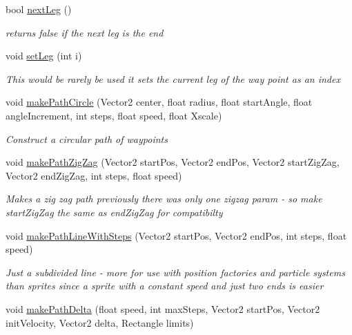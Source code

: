 \begin{DoxyCompactItemize}
bool \mbox{\hyperlink{class_r_c___framework_1_1_way_point_list_aa1d992bceb400ee9fcf657e6a4c379f8}{next\+Leg}} ()
\begin{DoxyCompactList}\small\item\em returns false if the next leg is the end ~\newline
\end{DoxyCompactList}\item 
void \mbox{\hyperlink{class_r_c___framework_1_1_way_point_list_ada4f7ff83ceacd5494f4ed71e8301c4d}{set\+Leg}} (int i)
\begin{DoxyCompactList}\small\item\em This would be rarely be used it sets the current leg of the way point as an index \end{DoxyCompactList}\item 
void \mbox{\hyperlink{class_r_c___framework_1_1_way_point_list_a4e5f6b4882fd8ad79fe45ff7ed5da4a1}{make\+Path\+Circle}} (Vector2 center, float radius, float start\+Angle, float angle\+Increment, int steps, float speed, float Xscale)
\begin{DoxyCompactList}\small\item\em Construct a circular path of waypoints \end{DoxyCompactList}\item 
void \mbox{\hyperlink{class_r_c___framework_1_1_way_point_list_a93115e08872305f07ab33703dfcda118}{make\+Path\+Zig\+Zag}} (Vector2 start\+Pos, Vector2 end\+Pos, Vector2 start\+Zig\+Zag, Vector2 end\+Zig\+Zag, int steps, float speed)
\begin{DoxyCompactList}\small\item\em Makes a zig zag path previously there was only one zigzag param -\/ so make start\+Zig\+Zag the same as end\+Zig\+Zag for compatibilty \end{DoxyCompactList}\item 
void \mbox{\hyperlink{class_r_c___framework_1_1_way_point_list_a27351971197e27dc2f7144030db5a34d}{make\+Path\+Line\+With\+Steps}} (Vector2 start\+Pos, Vector2 end\+Pos, int steps, float speed)
\begin{DoxyCompactList}\small\item\em Just a subdivided line -\/ more for use with position factories and particle systems than sprites since a sprite with a constant speed and just two ends is easier \end{DoxyCompactList}\item 
void \mbox{\hyperlink{class_r_c___framework_1_1_way_point_list_aee18abc5ce1b54b6b1c642307852a9ce}{make\+Path\+Delta}} (float speed, int max\+Steps, Vector2 start\+Pos, Vector2 init\+Velocity, Vector2 delta, Rectangle limits)

\end{DoxyCompactItemize}
